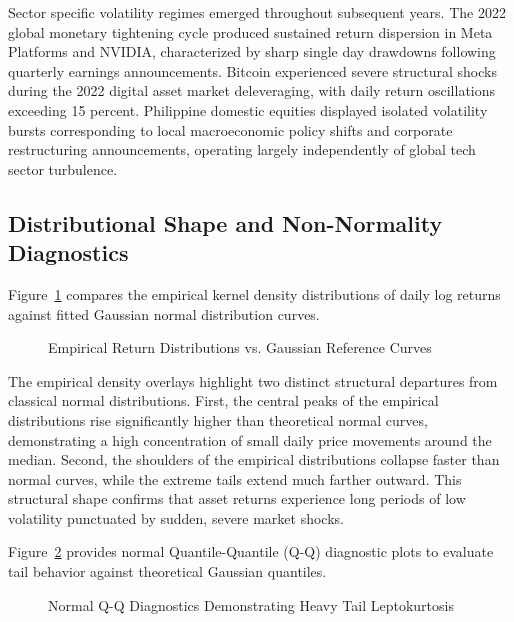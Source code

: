 Sector specific volatility regimes emerged throughout subsequent years. The 2022 global monetary tightening cycle produced sustained return dispersion in Meta Platforms and NVIDIA, characterized by sharp single day drawdowns following quarterly earnings announcements. Bitcoin experienced severe structural shocks during the 2022 digital asset market deleveraging, with daily return oscillations exceeding 15 percent. Philippine domestic equities displayed isolated volatility bursts corresponding to local macroeconomic policy shifts and corporate restructuring announcements, operating largely independently of global tech sector turbulence.

\subsection{Distributional Shape and Non-Normality Diagnostics}

Figure~\ref{fig:density_hist} compares the empirical kernel density distributions of daily log returns against fitted Gaussian normal distribution curves.

\begin{figure}[H]
  \centering
  \caption{Empirical Return Distributions vs. Gaussian Reference Curves}
  \label{fig:density_hist}
\end{figure}

The empirical density overlays highlight two distinct structural departures from classical normal distributions. First, the central peaks of the empirical distributions rise significantly higher than theoretical normal curves, demonstrating a high concentration of small daily price movements around the median. Second, the shoulders of the empirical distributions collapse faster than normal curves, while the extreme tails extend much farther outward. This structural shape confirms that asset returns experience long periods of low volatility punctuated by sudden, severe market shocks.

Figure~\ref{fig:qq_plots} provides normal Quantile-Quantile (Q-Q) diagnostic plots to evaluate tail behavior against theoretical Gaussian quantiles.

\begin{figure}[H]
  \centering
  \caption{Normal Q-Q Diagnostics Demonstrating Heavy Tail Leptokurtosis}
  \label{fig:qq_plots}
\end{figure}

